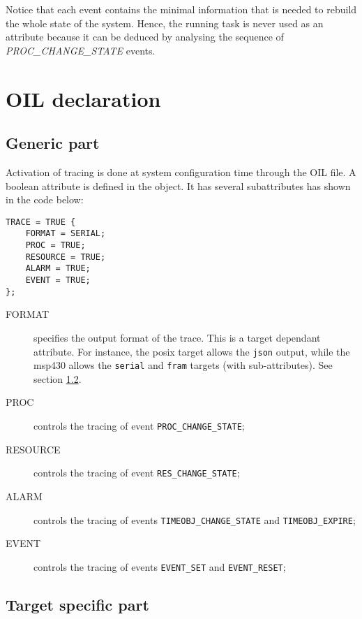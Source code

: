 Notice that each event contains the minimal information that is needed
to rebuild the whole state of the system.
Hence, the running task is never used as an attribute because it can be deduced
by analysing the sequence of \emph{PROC\_CHANGE\_STATE} events.

\section{OIL declaration}
\subsection{Generic part}

Activation of tracing is done at system configuration time through the OIL file.
A boolean attribute  is defined in the  object. It has
several subattributes has shown in the code below:

\begin{lstlisting}[language=OIL]
TRACE = TRUE {
    FORMAT = SERIAL;
    PROC = TRUE;
    RESOURCE = TRUE;
    ALARM = TRUE;
    EVENT = TRUE;
};
\end{lstlisting}

\begin{description}
	\item[FORMAT] specifies the output format of the trace. This is a target dependant attribute. For instance, the posix target allows the \texttt{json} output, while the msp430 allows the \texttt{serial} and \texttt{fram} targets (with sub-attributes). See section \ref{sec:traceTargetFormat}.

  \item[PROC] controls the tracing of event \texttt{PROC\_CHANGE\_STATE};

  \item[RESOURCE] controls the tracing of event \texttt{RES\_CHANGE\_STATE};

  \item[ALARM] controls the tracing of events \texttt{TIMEOBJ\_CHANGE\_STATE}
    and \texttt{TIMEOBJ\_EXPIRE};

  \item[EVENT]  controls the tracing of events \texttt{EVENT\_SET}
    and \texttt{EVENT\_RESET};
\end{description}

\subsection{Target specific part}
\label{sec:traceTargetFormat}
